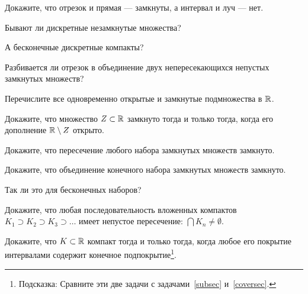 \documentclass[a4paper, 12pt, num=28]{listok}
\begin{document}
\begin{problem}
	Докажите, что отрезок и прямая --- замкнуты, а интервал и луч --- нет.
\end{problem}
\begin{problem}
\begin{probparts}
	\item Бывают ли дискретные незамкнутые множества?
	\item А бесконечные дискретные компакты?
\end{probparts}
\end{problem}
\begin{problem}
\begin{probparts}
	\item Разбивается ли отрезок в объединение двух непересекающихся непустых замкнутых множеств?
	\item Перечислите все одновременно открытые и замкнутые подмножества в $\mathbb{R}$.
\end{probparts}
\end{problem}
\begin{problem}
	Докажите, что множество $Z \subset \mathbb{R}$ замкнуто тогда и только тогда, когда его дополнение $\mathbb{R} \setminus Z$ открыто.
\end{problem}
\begin{problem}
	Докажите, что пересечение любого набора замкнутых множеств замкнуто.
\end{problem}
\begin{problem}
\begin{probparts}
	\item Докажите, что объединение конечного набора замкнутых множеств замкнуто.
	\item Так ли это для бесконечных наборов?
\end{probparts}
\end{problem}
\begin{problem}
	Докажите, что любая последовательность вложенных компактов $K_1 \supset K_2 \supset K_3 \supset \ldots$
	имеет непустое пересечение: $\bigcap K_n \ne \emptyset$.
\end{problem}
\begin{problem}
	Докажите, что $K \subset \mathbb{R}$ компакт тогда и только тогда, когда любое его покрытие интервалами содержит конечное подпокрытие\footnote{%
		Подсказка: Сравните эти две задачи с задачами~\ref{subsec} и~\ref{coversec}.
	}.
\end{problem}
\end{document}
